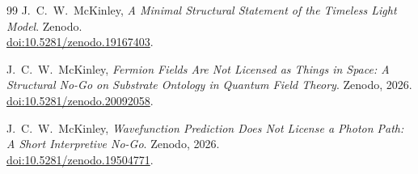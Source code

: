 \documentclass[12pt,onecolumn]{article}
\newcounter{nogo}[section]
\begin{document}
\begin{thebibliography}{99}
J.~C.~W.~McKinley,
\textit{A Minimal Structural Statement of the Timeless Light Model}.
Zenodo.\\
\href{https://doi.org/10.5281/zenodo.19167403}{doi:10.5281/zenodo.19167403}.

J.~C.~W.~McKinley,
\textit{Fermion Fields Are Not Licensed as Things in Space: A Structural No-Go on Substrate Ontology in Quantum Field Theory}.
Zenodo, 2026.\\
\href{https://doi.org/10.5281/zenodo.20092058}{doi:10.5281/zenodo.20092058}.

J.~C.~W.~McKinley,
\textit{Wavefunction Prediction Does Not License a Photon Path: A Short Interpretive No-Go}.
Zenodo, 2026.\\
\href{https://doi.org/10.5281/zenodo.19504771}{doi:10.5281/zenodo.19504771}.

\end{thebibliography}
\end{document}
